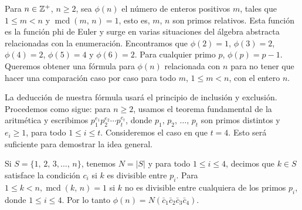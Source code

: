 \begin{myexample}
    Para $n \in \ZZ[+]$, $n \geq 2$, sea $\phi(n)$ el número de enteros positivos $m$, tales que $1 \leq m<n$ y $\operatorname{mcd}(m, \, n) = 1$, esto es, $m$, $n$ son primos relativos. Esta función es la función phi de Euler y surge en varias situaciones del álgebra abstracta relacionadas con la enumeración. Encontramos que $\phi(2)=1$, $\phi(3)=2$, $\phi(4)=2$, $\phi(5)=4$ y $\phi(6)=2$. Para cualquier primo $p$, $\phi(p) = p-1$. Queremos obtener una fórmula para $\phi(n)$ relacionada con $n$ para no tener que hacer una comparación caso por caso para todo $m$, $1 \leq m < n$, con el entero $n$.
    
    La deducción de nuestra fórmula usará el principio de inclusión y exclusión. Procedemos como sigue: para $n \geq 2$, usamos el teorema fundamental de la aritmética y escribimos $p_1^{e_1} p_2^{e_2} \cdots p_t^{e_t}$, donde $p_1, \, p_2, \, \dots, \, p_t$ son primos distintos y $e_i \geq 1$, para todo $1 \leq i \leq t$. Consideremos el caso en que $t=4$. Esto será suficiente para demostrar la idea general.
    
    Si $S=\{1, \, 2, \, 3, \dots, \, n\}$, tenemos $N = |S|$ y para todo $1 \leq i \leq 4$, decimos que $k \in S$ satisface la condición $c_i$ si $k$ es divisible entre $p_i$. Para $1 \leq k < n, \operatorname{mcd}(k, \, n) = 1$ si $k$ no es divisible entre cualquiera de los primos $p_i$, donde $1 \leq i \leq 4$. Por lo tanto $\phi(n) = N\left(\bar{c}_1 \bar{c}_2 \bar{c}_3 \bar{c}_4\right)$.
    

\end{myexample}
